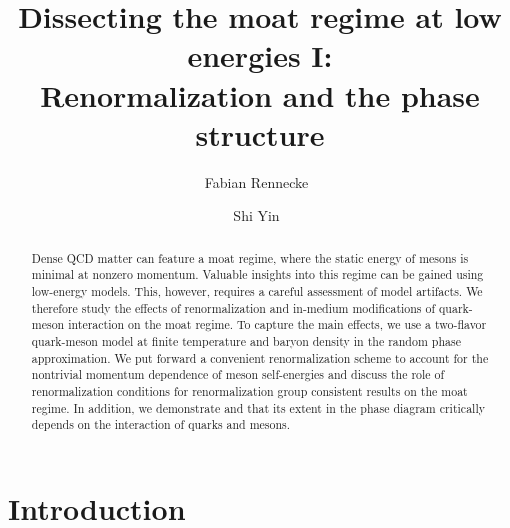 \documentclass[reprint,english,superscriptaddress,preprintnumbers,amsmath,amssymb,aps,prd]{revtex4-2}
\newcommand{\gettitle}{Dissecting the moat regime at low energies I:\\ Renormalization and the phase structure}
\begin{document}
\title{\gettitle}

\author{Fabian Rennecke \,}

\author{Shi Yin \,}

\begin{abstract}

Dense QCD matter can feature a moat regime, where the static energy of mesons is minimal at nonzero momentum. Valuable insights into this regime can be gained using low-energy models. This, however, requires a careful assessment of model artifacts. We therefore study the effects of renormalization and in-medium modifications of quark-meson interaction on the moat regime. To capture the main effects, we use a two-flavor quark-meson model at finite temperature and baryon density in the random phase approximation. We put forward a convenient renormalization scheme to account for the nontrivial momentum dependence of meson self-energies and discuss the role of renormalization conditions for renormalization group consistent results on the moat regime. In addition, we demonstrate and that its extent in the phase diagram critically depends on the interaction of quarks and mesons.

\end{abstract}

\maketitle
	
\section{Introduction}
\end{document}
